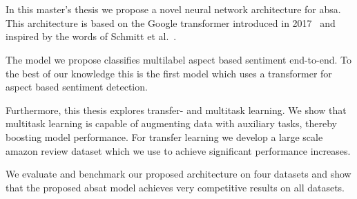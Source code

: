 \chapter{\abstractname}

In this master's thesis we propose a novel neural network architecture for \acrfull{absa}. This architecture is based on the Google transformer introduced in 2017~\cite{Vaswani2017} and inspired by the words of Schmitt et al.~\cite{Schmitt2018}.
\medskip

The model we propose classifies multilabel aspect based sentiment end-to-end. To the best of our knowledge this is the first model which uses a transformer for aspect based sentiment detection.
\medskip

Furthermore, this thesis explores transfer- and multitask learning. We show that multitask learning is capable of augmenting data with auxiliary tasks, thereby boosting model performance. For transfer learning we develop a large scale amazon review dataset which we use to achieve significant performance increases.
\medskip

We evaluate and benchmark our proposed architecture on four datasets and show that the proposed \acrfull{absat} model achieves very competitive results on all datasets.


